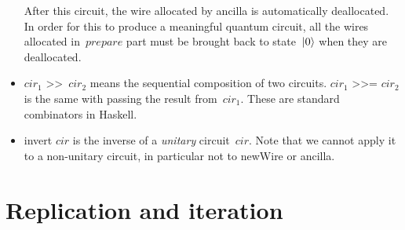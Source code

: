 \documentclass[11pt]{article}
\DeclarePairedDelimiter{\ket}{\lvert}{\rangle}
\newcommand{\var}[1]{\mathit{#1}}
\begin{document}
\begin{itemize}
  After this circuit, the wire allocated by \textsf{ancilla} is automatically deallocated.
  In order for this to produce a meaningful quantum circuit,
  all the wires allocated in~$\var{prepare}$ part must be brought back to state~$\ket0$
  when they are deallocated.
\item
  \textsf{$\var{cir}_1$ \textgreater\relax\textgreater\ $\var{cir}_2$}
  means the sequential composition of two circuits.
  \textsf{$\var{cir}_1$ \textgreater\relax\textgreater= $\var{cir}_2$}
  is the same with passing the result from~$\var{cir}_1$.
  These are standard combinators in Haskell.
\item
  \textsf{invert $\var{cir}$} is the inverse of a \emph{unitary} circuit~$\var{cir}$.
  Note that we cannot apply it to a non-unitary circuit,
  in particular not to \textsf{newWire} or \textsf{ancilla}.
\end{itemize}

\section{Replication and iteration}
\end{document}
